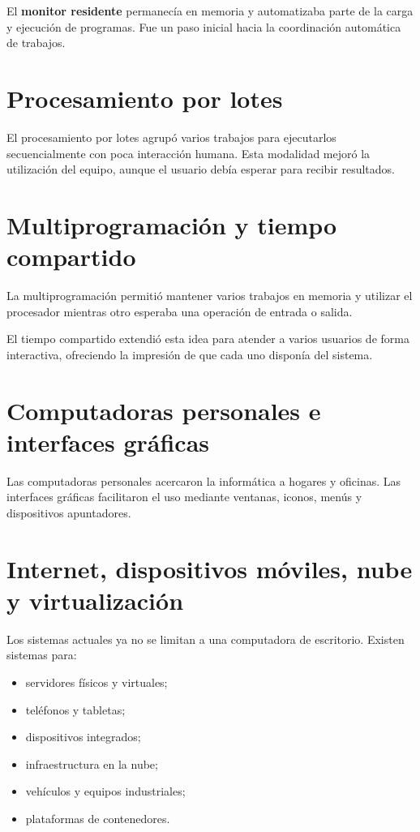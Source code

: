 \documentclass[
  spanish,
  letterpaper,
]{scrbook}
\providecommand{\tightlist}{%
  \setlength{\itemsep}{0pt}\setlength{\parskip}{0pt}}
\begin{document}
El \textbf{monitor residente} permanecía en memoria y automatizaba parte
de la carga y ejecución de programas. Fue un paso inicial hacia la
coordinación automática de trabajos.

\section{Procesamiento por lotes}\label{procesamiento-por-lotes}

El procesamiento por lotes agrupó varios trabajos para ejecutarlos
secuencialmente con poca interacción humana. Esta modalidad mejoró la
utilización del equipo, aunque el usuario debía esperar para recibir
resultados.

\section{Multiprogramación y tiempo
compartido}\label{multiprogramaciuxf3n-y-tiempo-compartido}

La multiprogramación permitió mantener varios trabajos en memoria y
utilizar el procesador mientras otro esperaba una operación de entrada o
salida.

El tiempo compartido extendió esta idea para atender a varios usuarios
de forma interactiva, ofreciendo la impresión de que cada uno disponía
del sistema.

\section{Computadoras personales e interfaces
gráficas}\label{computadoras-personales-e-interfaces-gruxe1ficas}

Las computadoras personales acercaron la informática a hogares y
oficinas. Las interfaces gráficas facilitaron el uso mediante ventanas,
iconos, menús y dispositivos apuntadores.

\section{Internet, dispositivos móviles, nube y
virtualización}\label{internet-dispositivos-muxf3viles-nube-y-virtualizaciuxf3n}

Los sistemas actuales ya no se limitan a una computadora de escritorio.
Existen sistemas para:

\begin{itemize}
\tightlist
\item
  servidores físicos y virtuales;
\item
  teléfonos y tabletas;
\item
  dispositivos integrados;
\item
  infraestructura en la nube;
\item
  vehículos y equipos industriales;
\item
  plataformas de contenedores.
\end{itemize}
\end{document}
